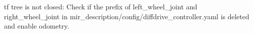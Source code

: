 tf tree is not closed\+: Check if the prefix of left\+\_\+wheel\+\_\+joint and right\+\_\+wheel\+\_\+joint in mir\+\_\+description/config/diffdrive\+\_\+controller.\+yaml is deleted and enable odometry. 